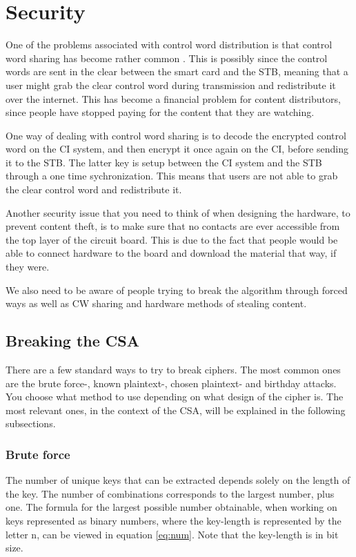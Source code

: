 \section{Security}
One of the problems associated with control word distribution is that 
control word sharing has become rather common \citep{Farncombe}. This 
is possibly since the control words are sent in the clear between the 
smart card and the STB, meaning that a user might grab the clear 
control word during transmission and redistribute it over the internet. 
This has become a financial problem for content distributors, since 
people have stopped paying for the content that they are watching.

One way of dealing with control word sharing is to decode the encrypted 
control word on the CI system, and then encrypt it once again on the CI,
before sending it to the STB. The latter key is setup between the CI 
system and the STB through a one time sychronization. This means that 
users are not able to grab the clear control word and redistribute it. 
\citep[pp. 12--13]{HIS:2011}

Another security issue that you need to think of when designing the 
hardware, to prevent content theft, is to make sure that no contacts 
are ever accessible from the top layer of the circuit board. This is 
due to the fact that people would be able to connect hardware to the 
board and download the material that way, if they were. 

We also need to be aware of people trying to break the algorithm 
through forced ways as well as CW sharing and hardware methods of 
stealing content.

\subsection{Breaking the CSA}
There are a few standard ways to try to break ciphers. The most common 
ones are the brute force-, known plaintext-, chosen plaintext- and 
birthday attacks. You choose what method to use depending on what design
of the cipher is. The most relevant ones, in the context of the CSA, 
will be explained in the following subsections. 
\citep[pp. 31-34]{Schneier:2003}

\subsubsection{Brute force}
The number of unique keys that can be extracted depends solely on the 
length of the key. The number of combinations corresponds to the 
largest number, plus one. The formula for the largest possible number 
obtainable, when working on keys represented as binary numbers, where 
the key-length is represented by the letter n, can be viewed in equation
\ref{eq:num}. Note that the key-length is in bit size.

